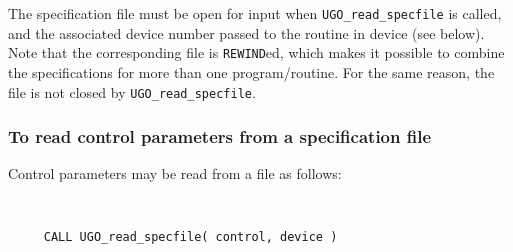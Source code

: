 \documentclass{galahad}
\newcommand{\packagename}{UGO}
\begin{document}
The specification file must be open for
input when {\tt \packagename\_read\_specfile}
is called, and the associated device number
passed to the routine in device (see below).
Note that the corresponding
file is {\tt REWIND}ed, which makes it possible to combine the specifications
for more than one program/routine.  For the same reason, the file is not
closed by {\tt \packagename\_read\_specfile}.

\subsubsection{To read control parameters from a specification file}
\label{readspec}

Control parameters may be read from a file as follows:
\hskip0.5in
\def\baselinestretch{0.8} {\tt
\begin{verbatim}
     CALL UGO_read_specfile( control, device )
\end{verbatim}
}
\def\baselinestretch{1.0}
\end{document}
